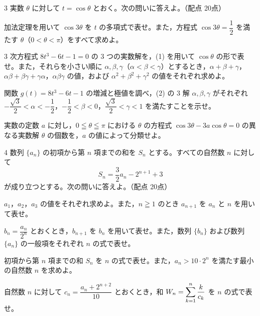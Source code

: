\begin{monsheet}
\begin{daimon}{3}
実数 $\theta$ に対して $t=\cos\theta$ とおく。次の問いに答えよ。\hfill（配点 20点）
\begin{shomon}
  \item 加法定理を用いて $\cos 3\theta$ を $t$ の多項式で表せ。また，方程式 $\cos 3\theta=\dfrac{1}{2}$ を満たす $\theta$（$0<\theta<\pi$）をすべて求めよ。
  \item $3$ 次方程式 $8t^{3}-6t-1=0$ の $3$ つの実数解を，(1) を用いて $\cos\theta$ の形で表せ。また，それらを小さい順に $\alpha, \beta, \gamma$（$\alpha<\beta<\gamma$）とするとき，$\alpha+\beta+\gamma$，$\alpha\beta+\beta\gamma+\gamma\alpha$，$\alpha\beta\gamma$ の値，および $\alpha^{2}+\beta^{2}+\gamma^{2}$ の値をそれぞれ求めよ。
  \item 関数 $g(t)=8t^{3}-6t-1$ の増減と極値を調べ，(2) の $3$ 解 $\alpha, \beta, \gamma$ がそれぞれ $-\dfrac{\sqrt{3}}{2}<\alpha<-\dfrac{1}{2}$，$-\dfrac{1}{2}<\beta<0$，$\dfrac{\sqrt{3}}{2}<\gamma<1$ を満たすことを示せ。
  \item 実数の定数 $a$ に対し，$0\leqq\theta\leqq\pi$ における $\theta$ の方程式 $\cos 3\theta-3a\cos\theta=0$ の異なる実数解 $\theta$ の個数を，$a$ の値によって分類せよ。
\end{shomon}
\end{daimon}

\clearpage

\begin{daimon}{4}
数列 $\{a_{n}\}$ の初項から第 $n$ 項までの和を $S_{n}$ とする。すべての自然数 $n$ に対して
\[
  S_{n} = \frac{3}{2}a_{n} - 2^{n+1} + 3
\]
が成り立つとする。次の問いに答えよ。\hfill（配点 20点）
\begin{shomon}
  \item $a_{1}$，$a_{2}$，$a_{3}$ の値をそれぞれ求めよ。また，$n\geqq 1$ のとき $a_{n+1}$ を $a_{n}$ と $n$ を用いて表せ。
  \item $b_{n}=\dfrac{a_{n}}{2^{n}}$ とおくとき，$b_{n+1}$ を $b_{n}$ を用いて表せ。また，数列 $\{b_{n}\}$ および数列 $\{a_{n}\}$ の一般項をそれぞれ $n$ の式で表せ。
  \item 初項から第 $n$ 項までの和 $S_{n}$ を $n$ の式で表せ。また，$a_{n}>10\cdot 2^{n}$ を満たす最小の自然数 $n$ を求めよ。
  \item 自然数 $n$ に対して $c_{n}=\dfrac{a_{n}+2^{n+2}}{10}$ とおくとき，和 $\displaystyle W_{n}=\sum_{k=1}^{n}\frac{k}{c_{k}}$ を $n$ の式で表せ。
\end{shomon}
\end{daimon}


\end{monsheet}
